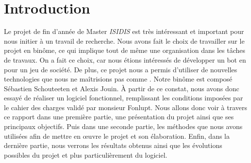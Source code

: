 \section{Introduction}
Le projet de fin d'année de Master \emph{ISIDIS} est très intéressant et important pour nous initier à un travail de recherche.
Nous avons fait le choix de travailler sur le projet \himalaya en binôme, ce qui implique tout de même une organisation dans les tâches de travaux.
On a fait ce choix, car nous étions intéressés de développer un bot en \java pour un jeu de société.
De plus, ce projet nous a permis d’utiliser de nouvelles technologies que nous ne maîtrisions pas comme \fx.
Notre binôme est composé Sébastien Schouteeten et Alexis Jouin.
À partir de ce constat, nous avons donc essayé de réaliser un logiciel fonctionnel, remplissant les conditions imposées par le cahier des charges validé par monsieur Fonlupt. Nous allons donc voir à travers ce rapport dans une première partie, une présentation du projet ainsi que ses principaux objectifs. Puis dans une seconde partie, les méthodes que nous avons utilisées afin de mettre en \oe uvre le projet et son élaboration. Enfin, dans la dernière partie, nous verrons les résultats obtenus ainsi que les évolutions possibles du projet et plus particulièrement du logiciel.